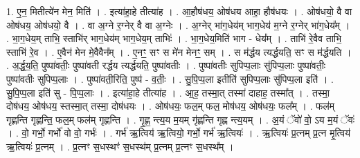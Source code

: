 \documentclass[17pt]{extarticle}
\begin{document}
1. ए॒न॒ मितीत्ये॑न मेन॒ मिति॑ । . इत्या॑हा॒हे तीत्या॑ह । . आ॒हौष॑धय॒ ओष॑धय आहा॒ हौष॑धयः । . ओष॑धयो॒ वै वा ओष॑धय॒ ओष॑धयो॒ वै । . वा अ॒ग्ने र॒ग्नेर् वै वा अ॒ग्नेः । . अ॒ग्नेर् भा॑ग॒धेय॑म् भाग॒धेय॑ म॒ग्ने र॒ग्नेर् भा॑ग॒धेय᳚म् । . भा॒ग॒धेय॒म् ताभि॒ स्ताभि॑र् भाग॒धेय॑म् भाग॒धेय॒म् ताभिः॑ । . भा॒ग॒धेय॒मिति॑ भाग - धेय᳚म् । . ताभि॑ रे॒वैव ताभि॒ स्ताभि॑ रे॒व । . ए॒वैन॑ मेन मे॒वैवैन᳚म् । . ए॒नꣳ॒॒ सꣳ स मे॑न मेनꣳ॒॒ सम् । . स म॑र्द्धय त्यर्द्धयति॒ सꣳ स म॑र्द्धयति । . अ॒र्द्ध॒य॒ति॒ पुष्पा॑वतीः॒ पुष्पा॑वती रर्द्धय त्यर्द्धयति॒ पुष्पा॑वतीः । . पुष्पा॑वतीः सुपिप्प॒लाः सु॑पिप्प॒लाः पुष्पा॑वतीः॒ पुष्पा॑वतीः सुपिप्प॒लाः । . पुष्पा॑वती॒रिति॒ पुष्प॑ - व॒तीः॒ । . सु॒पि॒प्प॒ला इतीति॑ सुपिप्प॒लाः सु॑पिप्प॒ला इति॑ । . सु॒पि॒प्प॒ला इति॑ सु - पि॒प्प॒लाः । . इत्या॑हा॒हे तीत्या॑ह । . आ॒ह॒ तस्मा॒त् तस्मा॑ दाहाह॒ तस्मा᳚त् । . तस्मा॒ दोष॑धय॒ ओष॑धय॒ स्तस्मा॒त् तस्मा॒ दोष॑धयः । . ओष॑धयः॒ फल॒म् फल॒ मोष॑धय॒ ओष॑धयः॒ फल᳚म् । . फल॑म् गृह्णन्ति गृह्णन्ति॒ फल॒म् फल॑म् गृह्णन्ति । . गृ॒ह्ण॒ न्त्य॒य म॒यम् गृ॑ह्णन्ति गृह्ण न्त्य॒यम् । . अ॒यं ॅवो॑ वो॒ ऽय म॒यं ॅवः॑ । . वो॒ गर्भो॒ गर्भो॑ वो वो॒ गर्भः॑ । . गर्भ॑ ऋ॒त्विय॑ ऋ॒त्वियो॒ गर्भो॒ गर्भ॑ ऋ॒त्वियः॑ । . ऋ॒त्वियः॑ प्र॒त्नम् प्र॒त्न मृ॒त्विय॑ ऋ॒त्वियः॑ प्र॒त्नम् । . प्र॒त्नꣳ स॒धस्थꣳ॑ स॒धस्थ॑म् प्र॒त्नम् प्र॒त्नꣳ स॒धस्थ᳚म् । \newline
\end{document}
